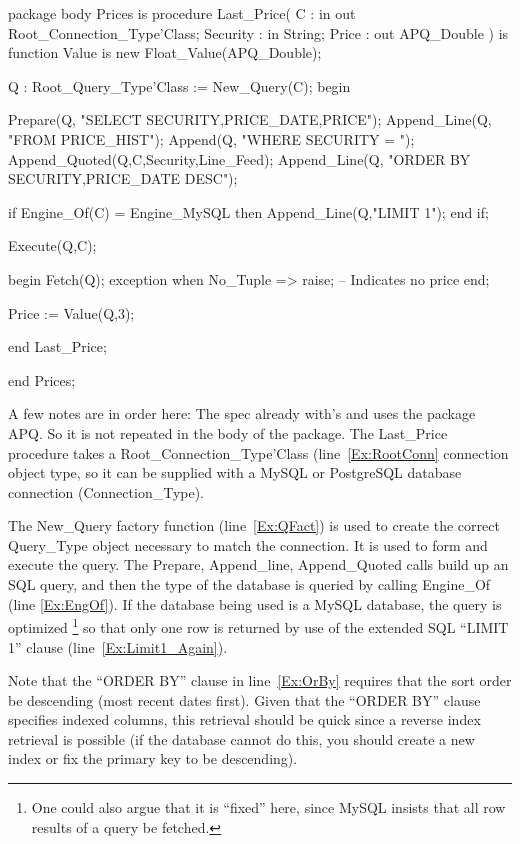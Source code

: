 \documentclass[english,letterpaper]{book}
\begin{document}
\begin{NumberedExample}
package body Prices is
   procedure Last_Price(
      C :        in out Root_Connection_Type'Class;\label{Ex:RootConn}
      Security : in     String;
      Price :       out APQ_Double
   ) is
      function Value is new Float_Value(APQ_Double);
  
      Q : Root_Query_Type'Class := New_Query(C);\label{Ex:QFact}
   begin
  
      Prepare(Q,     "SELECT SECURITY,PRICE_DATE,PRICE");
      Append_Line(Q, "FROM PRICE_HIST");
      Append(Q,      "WHERE SECURITY = ");
      Append_Quoted(Q,C,Security,Line_Feed);
      Append_Line(Q, "ORDER BY SECURITY,PRICE_DATE DESC");\label{Ex:OrBy}
 
      if Engine_Of(C) = Engine_MySQL then\label{Ex:EngOf}
         Append_Line(Q,"LIMIT 1");\label{Ex:Limit1_Again}
      end if;
 
      Execute(Q,C);
 
      begin
         Fetch(Q);
      exception
          when No_Tuple =>
             raise;    -- Indicates no price
      end;
 
      Price := Value(Q,3);
 
   end Last_Price;
 
end Prices;
\end{NumberedExample}

A few notes are in order here: The spec already with's and uses the
package APQ. So it is not repeated in the body of the package. The
Last\_Price procedure takes a Root\_Connection\_Type'Class
(line~\ref{Ex:RootConn} connection object type, so it can be supplied
with a MySQL or PostgreSQL database connection (Connection\_Type).

The New\_Query factory function (line~\ref{Ex:QFact}) is used to create
the correct Query\_Type object necessary to match the connection. It is
used to form and execute the query. The Prepare, Append\_line,
Append\_Quoted calls build up an SQL query, and then the type of the
database is queried by calling Engine\_Of (line \ref{Ex:EngOf}). If the
database being used is a MySQL database, the query is optimized
\footnote{One could also argue that it is {}``fixed'' here, since MySQL
insists that all row results of a query be fetched.} so that only one
row is returned by use of the extended SQL ``LIMIT 1'' clause
(line~\ref{Ex:Limit1_Again}).

Note that the ``ORDER BY'' clause in line~\ref{Ex:OrBy} requires that
the sort order be descending (most recent dates first). Given that the
``ORDER BY'' clause specifies indexed columns, this retrieval should
be quick since a reverse index retrieval is possible (if the database
cannot do this, you should create a new index or fix the primary key to
be descending).
\end{document}
